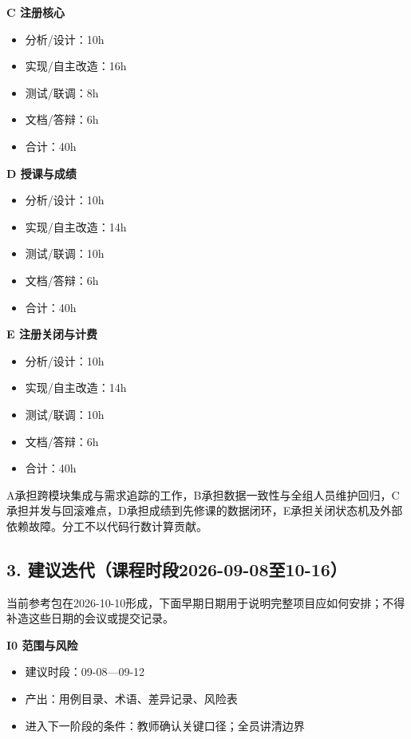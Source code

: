 \documentclass[UTF8,11pt,a4paper]{ctexart}
\providecommand{\tightlist}{\setlength{\itemsep}{0pt}\setlength{\parskip}{0pt}}
\begin{document}
\textbf{C 注册核心}

\begin{itemize}
\tightlist
\item
  分析/设计：10h
\item
  实现/自主改造：16h
\item
  测试/联调：8h
\item
  文档/答辩：6h
\item
  合计：40h
\end{itemize}

\textbf{D 授课与成绩}

\begin{itemize}
\tightlist
\item
  分析/设计：10h
\item
  实现/自主改造：14h
\item
  测试/联调：10h
\item
  文档/答辩：6h
\item
  合计：40h
\end{itemize}

\textbf{E 注册关闭与计费}

\begin{itemize}
\tightlist
\item
  分析/设计：10h
\item
  实现/自主改造：14h
\item
  测试/联调：10h
\item
  文档/答辩：6h
\item
  合计：40h
\end{itemize}

A承担跨模块集成与需求追踪的工作，B承担数据一致性与全组人员维护回归，C承担并发与回滚难点，D承担成绩到先修课的数据闭环，E承担关闭状态机及外部依赖故障。分工不以代码行数计算贡献。

\hypertarget{3-ux5efaux8baeux8fedux4ee3ux8bfeux7a0bux65f6ux6bb52026-09-08ux81f310-16}{%
\subsection{3.
建议迭代（课程时段2026-09-08至10-16）}\label{3-ux5efaux8baeux8fedux4ee3ux8bfeux7a0bux65f6ux6bb52026-09-08ux81f310-16}}

当前参考包在2026-10-10形成，下面早期日期用于说明完整项目应如何安排；不得补造这些日期的会议或提交记录。

\textbf{I0 范围与风险}

\begin{itemize}
\tightlist
\item
  建议时段：09-08---09-12
\item
  产出：用例目录、术语、差异记录、风险表
\item
  进入下一阶段的条件：教师确认关键口径；全员讲清边界
\end{itemize}
\end{document}
